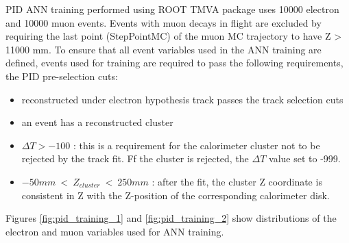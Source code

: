 PID ANN training performed using ROOT TMVA package uses 10000 electron and 10000 muon events.
Events with muon decays in flight are excluded by requiring the last point (StepPointMC)
of the muon MC trajectory to have Z > 11000 mm.
%
To ensure that all event variables used in the ANN training are defined, events used for training
are required to pass the following requirements, the PID pre-selection cuts:

\begin{itemize}
\item 
  reconstructed under electron hypothesis track passes the track selection cuts
\item 
  an event has a reconstructed cluster 
\item 
  $\Delta T > -100$ : this is a requirement for the calorimeter cluster not to be rejected by the track fit.
  Ff the cluster is rejected, the $\Delta T$ value set to -999.
\item
  $-50 mm ~<~ Z_{cluster} ~<~ 250 mm$ : after the fit, the cluster Z coordinate is consistent in Z with the
  Z-position of the corresponding calorimeter disk. 
\end{itemize}

Figures \ref{fig:pid_training_1} and \ref{fig:pid_training_2} show distributions of the electron
and muon variables used for ANN training.


